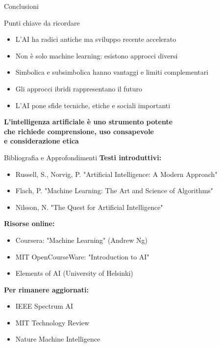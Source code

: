 \documentclass[aspectratio=169,12pt]{beamer}
\begin{document}
%
%
\begin{frame}{Conclusioni}
    \begin{block}{Punti chiave da ricordare}
        \begin{itemize}
            \item L'AI ha radici antiche ma sviluppo recente accelerato
            \item Non è solo machine learning: esistono approcci diversi
            \item Simbolica e subsimbolica hanno vantaggi e limiti complementari
            \item Gli approcci ibridi rappresentano il futuro
            \item L'AI pone sfide tecniche, etiche e sociali importanti
        \end{itemize}
    \end{block}
    
    \vspace{0.5cm}
    
    \begin{center}
        \textbf{L'intelligenza artificiale è uno strumento potente\\
        che richiede comprensione, uso consapevole\\
        e considerazione etica}
    \end{center}
\end{frame}
%
%
\begin{frame}{Bibliografia e Approfondimenti}
    \textbf{Testi introduttivi:}
    \begin{itemize}
        \item Russell, S., Norvig, P. "Artificial Intelligence: A Modern Approach"
        \item Flach, P. "Machine Learning: The Art and Science of Algorithms"
        \item Nilsson, N. "The Quest for Artificial Intelligence"
    \end{itemize}
    
    \vspace{0.3cm}
    
    \textbf{Risorse online:}
    \begin{itemize}
        \item Coursera: "Machine Learning" (Andrew Ng)
        \item MIT OpenCourseWare: "Introduction to AI"
        \item Elements of AI (University of Helsinki)
    \end{itemize}
    
    \vspace{0.3cm}
    
    \textbf{Per rimanere aggiornati:}
    \begin{itemize}
        \item IEEE Spectrum AI
        \item MIT Technology Review
        \item Nature Machine Intelligence
    \end{itemize}
\end{frame}
\end{document}
